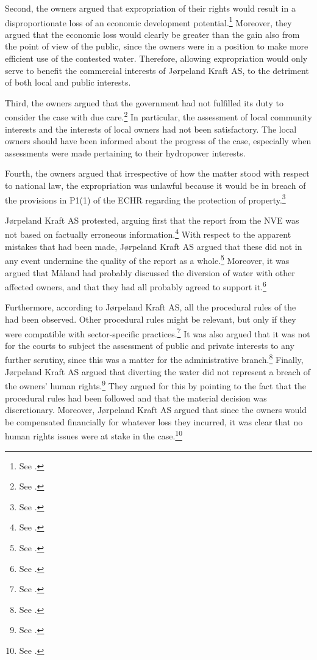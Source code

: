 Second, the owners argued that expropriation of their rights would result in a disproportionate loss of an economic development potential.\footnote{See \cite[5]{jorpeland11a}.} Moreover, they argued that the economic loss would clearly be greater than the gain also from the point of view of the public, since the owners were in a position to make more efficient use of the contested water. Therefore, allowing expropriation would only serve to benefit the commercial interests of Jørpeland Kraft AS, to the detriment of both local and public interests.

Third, the owners argued that the government had not fulfilled its duty to consider the case with due care.\footnote{See \cite[12]{jorpeland09}.} In particular, the assessment of local community interests and the interests of local owners had not been satisfactory. The local owners should have been informed about the progress of the case, especially when assessments were made pertaining to their hydropower interests.

Fourth, the owners argued that irrespective of how the matter stood with respect to national law, the expropriation was unlawful because it would be in breach of the provisions in P1(1) of the ECHR regarding the protection of property.\footnote{See \cite[07-08]{jorpeland09}.}

Jørpeland Kraft AS protested, arguing first that the report from the NVE was not based on factually erroneous information.\footnote{See \cite[16]{jorpeland11}.} With respect to the apparent mistakes that had been made, Jørpeland Kraft AS argued that these did not in any event undermine the quality of the report as a whole.\footnote{See \cite[2]{jorpeland11a}.} Moreover, it was argued that Måland had probably discussed the diversion of water with other affected owners, and that they had all probably agreed to support it.\footnote{See \cite[2]{jorpeland11a}.} 

Furthermore, according to Jørpeland Kraft AS, all the procedural rules of the \cite{wra17} had been observed. Other procedural rules might be relevant, but only if they were compatible with sector-specific practices.\footnote{See \cite[16]{jorpeland11}.} It was also argued that it was not for the courts to subject the assessment of public and private interests to any further scrutiny, since this was a matter for the administrative branch.\footnote{See \cite[2]{jorpeland11a}.} Finally, Jørpeland Kraft AS argued that diverting the water did not represent a breach of the owners' human rights.\footnote{See \cite[2]{jorpeland11a}.} They argued for this by pointing to the fact that the procedural rules had been followed and that the material decision was discretionary. Moreover, Jørpeland Kraft AS argued that since the owners would be compensated financially for whatever loss they incurred, it was clear that no human rights issues were at stake in the case.\footnote{See \cite[2]{jorpeland11a}.}

